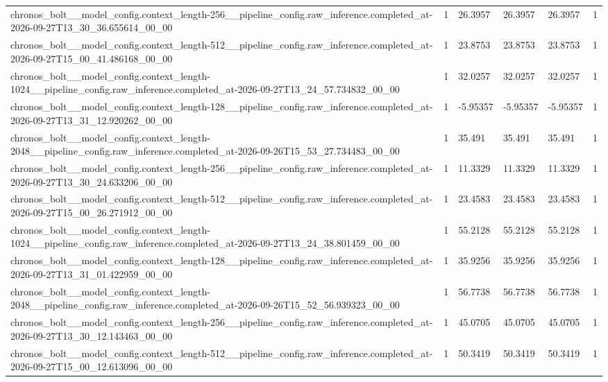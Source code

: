 \begin{tabular}{llllll}
chronos\_bolt\_\_model\_config.context\_length-256\_\_pipeline\_config.raw\_inference.completed\_at-2026-09-27T13\_30\_36.655614\_00\_00 & 1 & 26.3957 & 26.3957 & 26.3957 & 1 \\
chronos\_bolt\_\_model\_config.context\_length-512\_\_pipeline\_config.raw\_inference.completed\_at-2026-09-27T15\_00\_41.486168\_00\_00 & 1 & 23.8753 & 23.8753 & 23.8753 & 1 \\
chronos\_bolt\_\_model\_config.context\_length-1024\_\_pipeline\_config.raw\_inference.completed\_at-2026-09-27T13\_24\_57.734832\_00\_00 & 1 & 32.0257 & 32.0257 & 32.0257 & 1 \\
chronos\_bolt\_\_model\_config.context\_length-128\_\_pipeline\_config.raw\_inference.completed\_at-2026-09-27T13\_31\_12.920262\_00\_00 & 1 & -5.95357 & -5.95357 & -5.95357 & 1 \\
chronos\_bolt\_\_model\_config.context\_length-2048\_\_pipeline\_config.raw\_inference.completed\_at-2026-09-26T15\_53\_27.734483\_00\_00 & 1 & 35.491 & 35.491 & 35.491 & 1 \\
chronos\_bolt\_\_model\_config.context\_length-256\_\_pipeline\_config.raw\_inference.completed\_at-2026-09-27T13\_30\_24.633206\_00\_00 & 1 & 11.3329 & 11.3329 & 11.3329 & 1 \\
chronos\_bolt\_\_model\_config.context\_length-512\_\_pipeline\_config.raw\_inference.completed\_at-2026-09-27T15\_00\_26.271912\_00\_00 & 1 & 23.4583 & 23.4583 & 23.4583 & 1 \\
chronos\_bolt\_\_model\_config.context\_length-1024\_\_pipeline\_config.raw\_inference.completed\_at-2026-09-27T13\_24\_38.801459\_00\_00 & 1 & 55.2128 & 55.2128 & 55.2128 & 1 \\
chronos\_bolt\_\_model\_config.context\_length-128\_\_pipeline\_config.raw\_inference.completed\_at-2026-09-27T13\_31\_01.422959\_00\_00 & 1 & 35.9256 & 35.9256 & 35.9256 & 1 \\
chronos\_bolt\_\_model\_config.context\_length-2048\_\_pipeline\_config.raw\_inference.completed\_at-2026-09-26T15\_52\_56.939323\_00\_00 & 1 & 56.7738 & 56.7738 & 56.7738 & 1 \\
chronos\_bolt\_\_model\_config.context\_length-256\_\_pipeline\_config.raw\_inference.completed\_at-2026-09-27T13\_30\_12.143463\_00\_00 & 1 & 45.0705 & 45.0705 & 45.0705 & 1 \\
chronos\_bolt\_\_model\_config.context\_length-512\_\_pipeline\_config.raw\_inference.completed\_at-2026-09-27T15\_00\_12.613096\_00\_00 & 1 & 50.3419 & 50.3419 & 50.3419 & 1 \\

\end{tabular}
